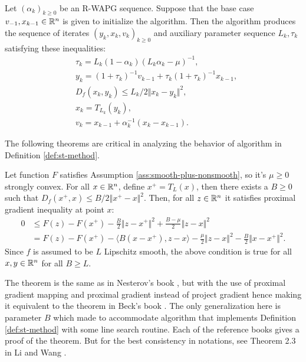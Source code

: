 \documentclass[12pt]{article}
\begin{document}
        \begin{definition}\;\label{def:st-method}\\
            Let $(\alpha_k)_{k \ge 0}$ be an R-WAPG sequence. 
            Suppose that the base case $v_{-1}, x_{k - 1}\in \mathbb R^n$ is given to initialize the algorithm. 
            Then the algorithm produces the sequence of iterates $(y_k, x_k, v_k)_{k \ge 0}$ and auxiliary parameter sequence $L_k, \tau_k$ satisfying these inequalities: 
            \begin{align*}
                & \tau_k = L_k(1 - \alpha_k)(L_k\alpha_k - \mu)^{-1}, 
                \\
                & y_k = (1 + \tau_k)^{-1} v_{k - 1} + \tau_k (1 + \tau_k)^{-1} x_{k - 1},
                \\
                & D_f(x_k, y_k) \le L_k/2\Vert x_k - y_k\Vert^2, 
                \\
                & x_k = T_{L_k}(y_k),
                \\
                & v_k = x_{k - 1} + \alpha_k^{-1}(x_k - x_{k - 1}). 
            \end{align*} 
        \end{definition}
        The following theorems are critical in analyzing the behavior of algorithm in Definition \ref{def:st-method}. 
        \begin{theorem}\label{thm:pg-ineq}
            Let function $F$ satisfies Assumption \ref{ass:smooth-plus-nonsmooth}, so it's $\mu \ge 0$ strongly convex. 
            For all $x\in \mathbb R^n$, define $x^+ = T_L(x)$, then there exists a $B \ge 0$ such that $D_f(x^+, x) \le B/2 \Vert x^+ - x\Vert^2$. 
            Then, for all $z \in \mathbb R^n$ it satisfies proximal gradient inequality at point $x$:  
            \begin{align*}
                0&\le F(z) - F(x^+) - \frac{B}{2}\Vert z - x^+\Vert^2  + \frac{B - \mu}{2}\Vert z - x\Vert^2
                \\
                &=  F(z) - F(x^+) - \langle B(x - x^+), z - x\rangle
                - \frac{\mu}{2}\Vert z - x\Vert^2
                - \frac{B}{2}\Vert x - x^+\Vert^2. 
            \end{align*}
            Since $f$ is assumed to be $L$ Lipschitz smooth, the above condition is true for all $x, y \in \mathbb R^n$ for all $B \ge L$. 
        \end{theorem}
        \begin{remark}
            The theorem is the same as in Nesterov's book \cite[Theorem 2.2.13]{nesterov_lectures_2018}, but with the use of proximal gradient mapping and proximal gradient instead of project gradient hence making it equivalent to the theorem in Beck's book \cite[Theorem 10.16]{beck_first-order_2017}. 
            The only generalization here is parameter $B$ which made to accommodate algorithm that implements Definition \ref{def:st-method} with some line search routine. 
            Each of the reference books gives a proof of the theorem. 
            But for the best consistency in notations, see Theorem 2.3 in Li and Wang \cite{li_relaxed_2025}. 
        \end{remark}
\end{document}
